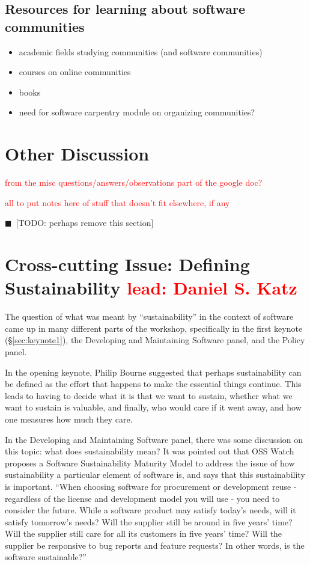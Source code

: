 \documentclass[11pt, oneside]{amsart}
\newcommand{\todo}[1]{{\color{blue}$\blacksquare$~\textsf{[TODO: #1]}}}
\newcommand{\note}[1]{ {\textcolor{red}    { #1 }}}
\begin{document}
\subsection{Resources for learning about software communities}
\begin{itemize}
\item academic fields studying communities (and software communities)
\item courses on online communities
\item books
\item need for software carpentry module on organizing communities?
\end{itemize}

\section{Other Discussion} \label{sec:other}

\note{from the misc questions/answers/observations part of the google doc?}

\note{all to put notes here of stuff that doesn't fit elsewhere, if any}

\todo{perhaps remove this section}


\section{Cross-cutting Issue: Defining Sustainability \note{lead: Daniel S. Katz}}  \label{sec:cross-cutting}

The question of what was meant by ``sustainability'' in the context of software
came up in many different parts of the workshop, specifically in the first
keynote (\S\ref{sec:keynote1}), the Developing and Maintaining Software panel,
and the Policy panel.

In the opening keynote, Philip Bourne suggested that perhaps sustainability can
be defined as the effort that happens to make the essential things continue.
This leads to having to decide what it is that we want to sustain, whether what
we want to sustain is valuable, and finally, who would care if it went away,
and how one measures how much they care.

In the Developing and Maintaining Software panel, there was some discussion on
this topic: what does sustainability mean? It was pointed out that OSS Watch
proposes a Software Sustainability Maturity Model to address the issue of how
sustainability a particular element of software is, and says that this
sustainability is important. ``When choosing software for procurement or
development reuse - regardless of the license and development model you will
use - you need to consider the future. While a software product may satisfy
today's needs, will it satisfy tomorrow's needs? Will the supplier still be
around in five years' time? Will the supplier still care for all its customers
in five years' time? Will the supplier be responsive to bug reports and feature
requests? In other words, is the software sustainable?''~\cite{OSS-ssmm-web}
\end{document}
